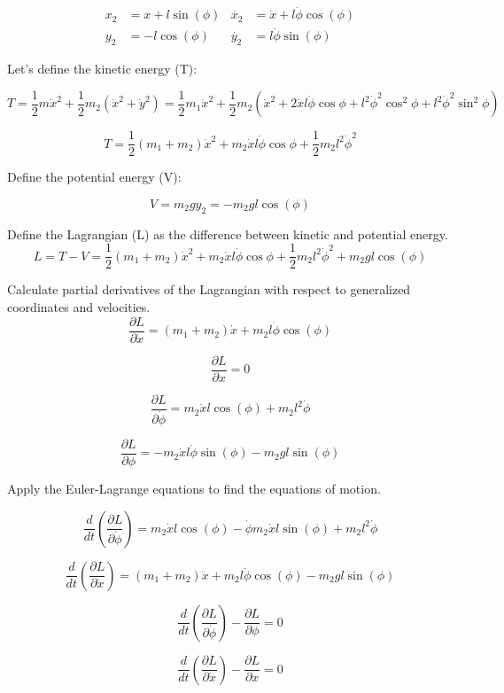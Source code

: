 \documentclass{article}
\begin{document}
\begin{align*}
  x_2 &= x + l \sin(\phi) & \dot{x_2} &= \dot{x} + l \dot{\phi} \cos(\phi) \\
  y_2 &= -l \cos(\phi) & \dot{y_2} &= l \dot{\phi} \sin(\phi)
\end{align*}

Let's define the kinetic energy (T):

\[T = \frac{1}{2} m \dot{x}^2 + \frac{1}{2} m_2 (\dot{x}^2 + \dot{y}^2) = \frac{1}{2} m_1 \dot{x}^2 + \frac{1}{2} m_2 (\dot{x}^2 + 2 \dot{x} l \dot{\phi} \cos{\phi} + l^2 \dot{\phi}^2 \cos^2{\phi} + l^2 \dot{\phi}^2 \sin^2{\phi})\]

\[T = \frac{1}{2} (m_1+m_2) \dot{x}^2  + m_2 \dot{x} l \dot{\phi} \cos{\phi} + \frac{1}{2} m_2 l^2 \dot{\phi}^2\]

Define the potential energy (V):

\[V = m_2 g y_2 = -m_2 g l \cos(\phi)\]

Define the Lagrangian (L) as the difference between kinetic and potential energy.
\[L = T - V = \frac{1}{2} (m_1+m_2) \dot{x}^2  + m_2 \dot{x} l \dot{\phi} \cos{\phi} + \frac{1}{2} m_2 l^2 \dot{\phi}^2 + m_2 g l \cos(\phi)\]

Calculate partial derivatives of the Lagrangian with respect to generalized coordinates and velocities.
\[ \frac{\partial L}{\partial \dot{x}} = (m_1+m_2) \dot{x} + m_2 l \dot{\phi} \cos(\phi)\]

\[ \frac{\partial L}{\partial x} = 0\]

\[ \frac{\partial L}{\partial \dot{\phi}} = m_2 \dot x l \cos(\phi) + m_2 l^2 \dot \phi\]

\[ \frac{\partial L}{\partial \phi} = -m_2 \dot x l \dot \phi \sin(\phi) - m_2 g l \sin(\phi)\]

Apply the Euler-Lagrange equations to find the equations of motion.

\[\frac{d}{dt} \left( \frac{\partial L}{\partial \dot{\phi}} \right) = m_2 \dot{x} l \cos(\phi) - \dot{\phi} m_2 \dot{x} l \sin(\phi) + m_2 l^2 \dot{\phi}
\] 

\[\frac{d}{dt} \left( \frac{\partial L}{\partial \dot{x}} \right) = (m_1+m_2) \ddot x + m_2 l \ddot \phi \cos(\phi) - m_2 g l \sin(\phi)\]

\[\frac{d}{dt} \left( \frac{\partial L}{\partial \dot{\phi}} \right) - \frac{\partial L}{\partial \phi} = 0\]

\[\frac{d}{dt} \left( \frac{\partial L}{\partial \dot{x}} \right) - \frac{\partial L}{\partial x} = 0\]
\end{document}
